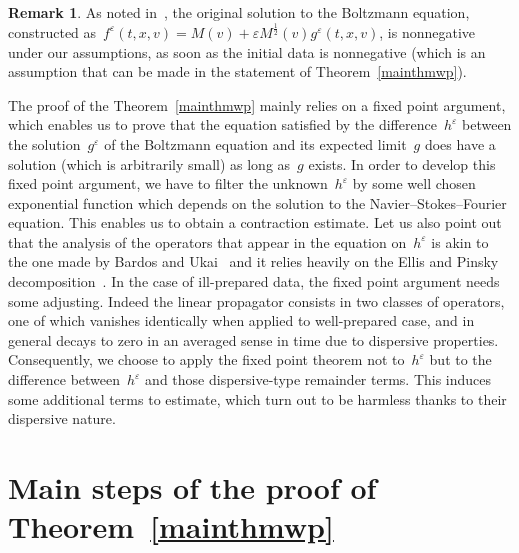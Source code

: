 \documentclass[11pt]{article}
\theoremstyle{definition}
\newtheorem{rema}[theo]{Remark}
\numberwithin{equation}{section}
\numberwithin{figure}{section}
\numberwithin{table}{section}
\newcommand*\e{{\varepsilon}}
\begin{document}
\begin{rema}
As noted in~\cite{luzhang}, the original solution to the Boltzmann equation, constructed as~$f^\e(t,x,v)= M(v) + \e M^\frac12(v) g^\e(t,x,v)$, is nonnegative under our assumptions, as soon as the initial data is nonnegative (which is an assumption that can be made in the statement of Theorem~\ref{mainthmwp}).
\end{rema}

The proof of the Theorem~\ref{mainthmwp} mainly relies on a fixed point argument, which enables us to prove that the equation satisfied by the difference~$h^\e$ between the solution~$g^\e$ of the Boltzmann equation and its expected limit~$g$ does have a solution (which is arbitrarily small) as long as~$g$ exists. In order to develop this fixed point argument, we have to filter the unknown~$h^\e$ by some well chosen exponential function which depends on the solution to the Navier--Stokes--Fourier equation. This enables us to obtain a contraction estimate. Let us also point out that the analysis of the operators that appear in the equation on~$h^\e$ is akin to the one made by Bardos and Ukai~\cite{Bardos-Ukai} and it relies heavily on the Ellis and Pinsky decomposition~\cite{Ellis-Pinsky}. In the case of ill-prepared data, the fixed point argument needs some adjusting. Indeed the linear propagator consists in two classes of operators, one of which vanishes identically when applied to well-prepared case, and in general decays to zero in an averaged sense in time due to dispersive properties. Consequently, we choose to apply the fixed point theorem not to~$h^\e$ but to the difference between~$h^\e$ and those dispersive-type remainder terms. This induces some additional terms to estimate, which turn out to be harmless thanks to their dispersive nature.



\section{Main steps of the proof of Theorem~\ref{mainthmwp}}
\end{document}
